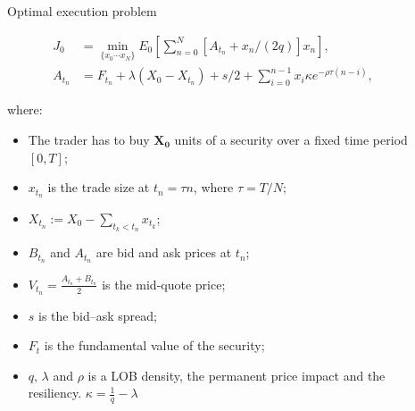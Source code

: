 \documentclass[]{beamer}
\begin{document}
\begin{frame}[t]
\begin{columns}[t]
\begin{column}{\onecolwid}
\begin{block}{Optimal execution problem}
        
        \begin{align} \label{optexp}
           J_0 &= \min _{\{x_0 \cdots x_N \}} E_0 \left[ \sum _{n=0}^N [A_{t_n} + x_n /(2q)] x_n\right],  \\
           A_{t_n} &= F_{t_n} + \lambda (X_0 - X_{t_n}) + s/2 + \sum _{i=0}^{n-1} x_i \kappa e^{- \rho \tau (n - i)},
        \end{align}
        
       where:
       \begin{itemize}
        \item The trader has to buy $\mathbf{X_0}$ units of a security over a fixed time period $[0,T]$; 
        \item $x_{t_n}$ 
        is the trade size at $t_n = \tau n$, where $\tau = T / N$;
        \item $X_{t_n} := X_0 - \sum _{t_k < t_n} x_{t_k}$;
        \item $B_{t_n}$ and $A_{t_n}$ are bid and ask prices at $t_n$; 
        \item $V_{t_n} = \frac{A_{t_n} + B_{t_n}}{2}$ 
        is the mid-quote price; 
        \item $s$ is the bid–ask spread;
        \item $F_t$ is the fundamental value of the security;
        \item $q$, $\lambda$ and $\rho$ is a LOB density, the permanent price impact and the resiliency. $\kappa = \frac{1}{q} - \lambda $

       \end{itemize}
        \end{block}
    
    
    \end{column} 
    \begin{column}{\sepwid}\end{column} %
    
    \begin{column}{\onecolwid} %
    


\end{column}
\end{columns}
\end{frame}
\end{document}
